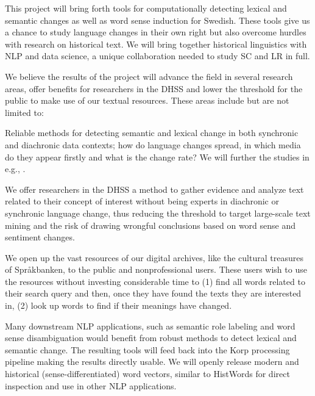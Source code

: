 \documentclass[12pt,twoside,a4paper]{article}
\begin{document}
	
	This project will bring forth tools for computationally detecting lexical and semantic changes as well as word sense induction for Swedish. These tools give us a chance to study language changes in their own right but also overcome hurdles with research on historical text. We will bring together historical linguistics with NLP and data science, a unique collaboration needed to study SC and LR in full. 
	
	We believe the results of the project will advance the field in several research areas, offer benefits for researchers in the DHSS and lower the threshold for the public to make use of our textual resources. These areas include but are not limited to:
	
	\vspace{-0.3em}
	\begin{compactitem}
		\item Reliable methods for detecting semantic and lexical change in both synchronic and diachronic data contexts; how do language changes spread, in which media do they appear firstly and what is the change rate? We will further the studies in e.g., \cite{vejdemo_semantic_2016}.
		\item We offer researchers in the DHSS a method to gather evidence and analyze text related to their concept of interest without being experts in diachronic or synchronic language change, thus reducing the threshold to target large-scale text mining and the risk of drawing wrongful conclusions based on word sense and sentiment changes. 
		\item We open up the vast resources of our digital archives, like the cultural treasures of Språkbanken, to the public and nonprofessional users. These users wish to use the resources without investing considerable time to (1) find all words related to their search query and then, once they have found the texts they are interested in, (2) look up words to find if their meanings have changed.  
		\item Many downstream NLP applications, such as semantic role labeling and word sense disambiguation would benefit from robust methods to detect lexical and semantic change. The resulting tools will feed back into the Korp processing pipeline making the results directly usable.  We will openly release modern and historical (sense-differentiated) word vectors, similar to HistWords \citep{DiachronicWordEmb} for direct inspection and use in other NLP applications. 
	\end{compactitem} 
	\vspace{-0.3em}
	
\end{document}
